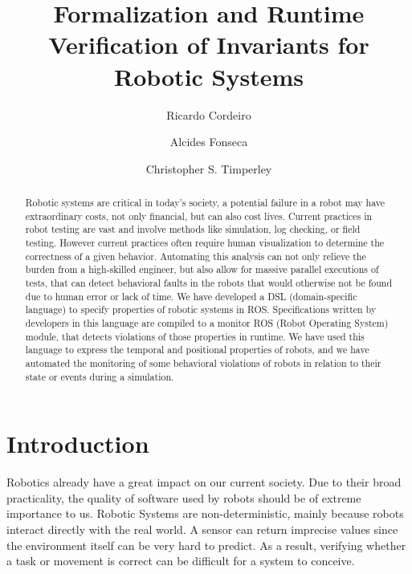 \documentclass[runningheads]{llncs}
\begin{document}
%
\title{Formalization and Runtime Verification of Invariants for
Robotic Systems}
%
%
\author{Ricardo Cordeiro \and
Alcides Fonseca \and
Christopher S. Timperley}
%
%
%
\maketitle              %
%
\begin{abstract}
    Robotic systems are critical in today's society, a potential failure in a robot may have extraordinary costs, not only financial, but can also cost lives.
    Current practices in robot testing are vast and involve methods like simulation, log checking, or field testing. However current practices often require human visualization to determine the correctness of a given behavior. Automating this analysis can not only relieve the burden from a high-skilled engineer, but also allow for massive parallel executions of tests, that can detect behavioral faults in the robots that would otherwise not be found due to human error or lack of time.
    We have developed a DSL (domain-specific language) to specify properties of robotic systems in ROS. Specifications written by developers in this language are compiled to a monitor ROS (Robot Operating System) module, that detects violations of those properties in runtime. We have used this language to express the temporal and positional properties of robots, and we have automated the monitoring of some behavioral violations of robots in relation to their state or events during a simulation.

\end{abstract}
%
%
%
\section{Introduction}

Robotics already have a great impact on our current society. Due to their broad practicality, the quality of software used by robots should be of extreme importance to us. Robotic Systems are non-deterministic, mainly because robots interact directly with the real world. A sensor can return imprecise values since the environment itself can be very hard to predict. As a result, verifying whether a task or movement is correct can be difficult for a system to conceive.
\end{document}
